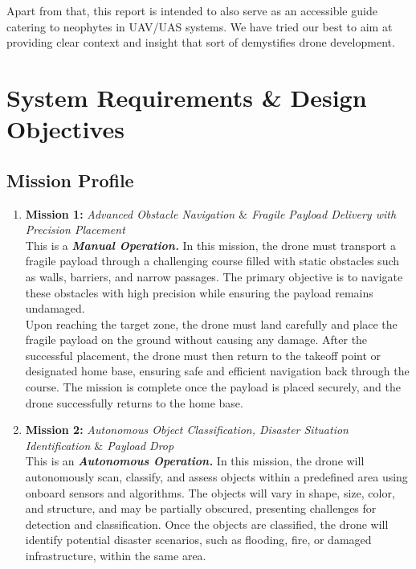 \documentclass[12pt]{report}
\begin{document}
    \noindent Apart from that, this report is intended to also serve as an accessible guide catering to neophytes in UAV/UAS systems. We have tried our best to aim at providing clear context and insight that sort of demystifies drone development. \\

  \section{System Requirements \& Design Objectives}
    \subsection{Mission Profile}
    \begin{enumerate}
      \item \textbf{Mission 1:} \textit{Advanced Obstacle Navigation $\&$ Fragile Payload Delivery with Precision Placement} \\
        This is a \textbf{\textit{Manual Operation.}} In this mission, the drone must transport a fragile payload through a challenging course filled with static obstacles such as walls, barriers, and narrow passages. The primary objective is to navigate these obstacles with high precision while ensuring the payload remains undamaged. \\
        
        Upon reaching the target zone, the drone must land carefully and place the fragile payload on the ground without causing any damage. After the successful placement, the drone must then return to the takeoff point or designated home base, ensuring safe and efficient navigation back through the course. The mission is complete once the payload is placed securely, and the drone successfully returns to the home base.
      \item \textbf{Mission 2:} \textit{Autonomous Object Classification, Disaster Situation Identification $\&$ Payload Drop }\\
        This is an \textbf{\textit{Autonomous Operation.}} In this mission, the drone will autonomously scan, classify, and assess objects within a predefined area using onboard sensors and algorithms. The objects will vary in shape, size, color, and structure, and may be partially obscured, presenting challenges for detection and classification. Once the objects are classified, the drone will identify potential disaster scenarios, such as flooding, fire, or damaged infrastructure, within the same area.
    \end{enumerate}
\end{document}
